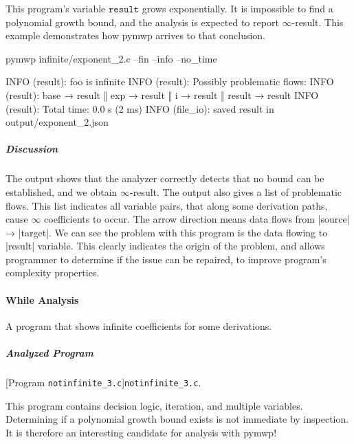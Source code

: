 This program's variable \(\texttt{result}\) grows exponentially.
It is impossible to find a polynomial growth bound, and the analysis is expected to report \(\infty\)-result.
This example demonstrates how pymwp arrives to that conclusion.

\begin{cmdlisting}[label={lst:ex2-run-cmd}]
pymwp infinite/exponent_2.c --fin --info --no_time
\end{cmdlisting}

\begin{outlisting}[label={lst:ex2-output}]
INFO (result): foo is infinite
INFO (result): Possibly problematic flows:
INFO (result): base → result ‖ exp → result ‖ i → result ‖ result → result
INFO (result): Total time: 0.0 s (2 ms)
INFO (file_io): saved result in output/exponent_2.json
\end{outlisting}

\subparagraph*{Discussion}
The output shows that the analyzer correctly detects that no bound can
be established, and we obtain \(\infty\)-result.
The output also gives a list of problematic flows.
This list indicates all variable pairs, that along some derivation paths, cause \(\infty\) coefficients to occur.
The arrow direction means data flows from \pr|source| → \pr|target|.
We can see the problem with this program is the data flowing to \pr|result| variable.
This clearly indicates the origin of the problem, and allows programmer to determine if the issue can be
repaired, to improve program's complexity properties.

\paragraph{While Analysis}\label{while-analysis}
A program that shows infinite coefficients for some derivations.

\subparagraph*{Analyzed Program}

\begin{center}
\begin{minipage}{\textwidth}
[Program \texttt{notinfinite\_3.c}]{\texttt{notinfinite\_3.c}.}
\label{lst:notinfinite3}
\end{minipage}
\end{center}

This program contains decision logic, iteration, and multiple variables.
Determining if a polynomial growth bound exists is not immediate by inspection.
It is therefore an interesting candidate for analysis with pymwp!

